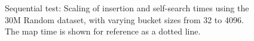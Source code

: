 \begin{landscape}
    \begin{figure}[H]
        \caption{Sequential test: Scaling of insertion and self-search times
        using the 30M Random dataset, with varying bucket sizes from 32 to
        4096. The {\keyword map} time is shown for reference as a dotted line.}
        \label{fig:seq_30m}
    \end{figure}
\end{landscape}



